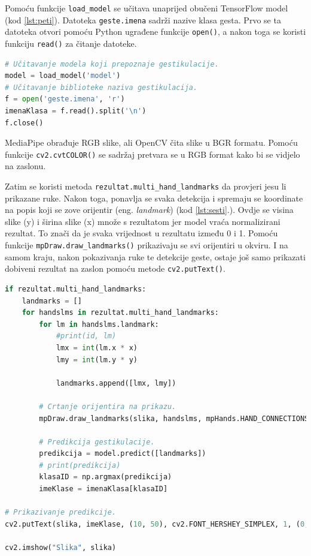 \documentclass[]{foi} %
\begin{document}
\newpage
Pomoću funkcije \texttt{load\_model} se učitava unaprijed obučeni TensorFlow model (kod \ref{lst:peti}).
Datoteka \texttt{geste.imena} sadrži nazive klasa gesta. Prvo se ta datoteka otvori pomoću Python ugrađene funkcije \texttt{open()}, a nakon toga se koristi funkciju \texttt{read()} za čitanje datoteke.

\begin{lstlisting}[language=Python, caption={[Inicijalizacija TensorFlowa] Inicijalizacija TensorFlowa}, label=lst:peti]
# Učitavanje modela koji prepoznaje gestikulacije.
model = load_model('model')
# Učitavanje biblioteke naziva gestikulacija.
f = open('geste.imena', 'r')
imenaKlasa = f.read().split('\n')
f.close()
\end{lstlisting}

MediaPipe obrađuje RGB slike, ali OpenCV čita slike u BGR formatu. Pomoću funkcije \texttt{cv2.cvtCOLOR()} se sadržaj pretvara se u RGB format kako bi se vidjelo na zaslonu.

Zatim se koristi metoda \texttt{rezultat.multi\_hand\_landmarks} da provjeri jesu li prikazane ruke.
Nakon toga, ponavlja se svaka detekcija i spremaju se koordinate na popis koji se zove orijentir (eng. \textit{landmark}) (kod \ref{lst:sesti}.).
Ovdje se visina slike (y) i širina slike (x) množe s rezultatom jer model vraća normalizirani rezultat. To znači da je svaka vrijednost u rezultatu između 0 i 1.
Pomoću funkcije \texttt{mpDraw.draw\_landmarks()} prikazivaju se svi orijentiri u okviru. I na samom kraju, nakon pokazivanja ruke te detekcije geste, ostaje još samo prikazati dobiveni rezultat na zaslon pomoću metode \texttt{cv2.putText()}.

\begin{lstlisting}[language=Python, caption={[Prepoznavanje geste] Prepoznavanje geste}, label=lst:sesti]
if rezultat.multi_hand_landmarks:
    landmarks = []
    for handslms in rezultat.multi_hand_landmarks:
        for lm in handslms.landmark:
            #print(id, lm)
            lmx = int(lm.x * x)
            lmy = int(lm.y * y)

            landmarks.append([lmx, lmy])

        # Crtanje orijentira na prikazu.
        mpDraw.draw_landmarks(slika, handslms, mpHands.HAND_CONNECTIONS)

        # Predikcija gestikulacije.
        predikcija = model.predict([landmarks])
        # print(predikcija)
        klasaID = np.argmax(predikcija)
        imeKlase = imenaKlasa[klasaID]

# Prikazivanje predikcije.
cv2.putText(slika, imeKlase, (10, 50), cv2.FONT_HERSHEY_SIMPLEX, 1, (0, 0, 255), 2, cv2.LINE_AA)

cv2.imshow("Slika", slika)
\end{lstlisting}
\end{document}
